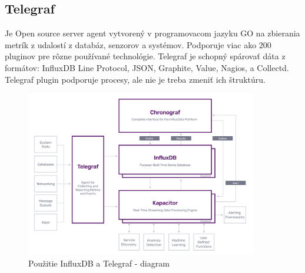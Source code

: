 \documentclass[./main.tex]{subfiles}
\begin{document}
\subsection{Telegraf}

Je Open source server agent vytvorený v programovacom jazyku GO na zbierania metrík z udalostí z databáz, senzorov a systémov. Podporuje viac ako 200 pluginov pre rôzne používané technológie. Telegraf je schopný spárovať dáta z formátov: InfluxDB Line Protocol, JSON, Graphite, Value, Nagios, a Collectd. Telegraf plugin podporuje procesy, ale nie je treba zmeniť ich štruktúru.
\begin{figure}[h!]
    \centering
    \includegraphics[width=0.9\textwidth]{images/telegraf.png}
    \caption{Použitie InfluxDB a Telegraf - diagram\cite{telegraf}}
    \label{fig:telegraf}
\end{figure}
\end{document}
